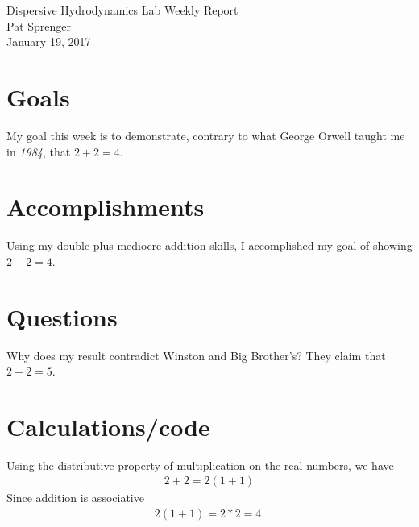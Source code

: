 \documentclass[12 pt]{article}
\newcommand{\theDate}{January 19, 2017} %
\newcommand{\yourName}{Pat Sprenger} %
\begin{document}
\begin{center}
Dispersive Hydrodynamics Lab Weekly Report \\
\yourName\\
\theDate
\end{center}

\section*{Goals} %

My goal this week is to demonstrate, contrary to what George Orwell taught me in \textit{1984}, that $2+2 = 4.$

\section*{Accomplishments}

Using my double plus mediocre addition skills, I accomplished my goal of showing $2+2 = 4$. 

\section*{Questions} %

Why does my result contradict Winston and Big Brother's? They claim that $2+2 = 5$. 

\section*{Calculations/code}
Using the distributive property of multiplication on the real numbers, we have 
\begin{align*}
2+2 = 2(1+1)
\end{align*}
Since addition is associative 
\begin{align*}
2(1+1) = 2*2 = 4.
\end{align*}
\end{document}
